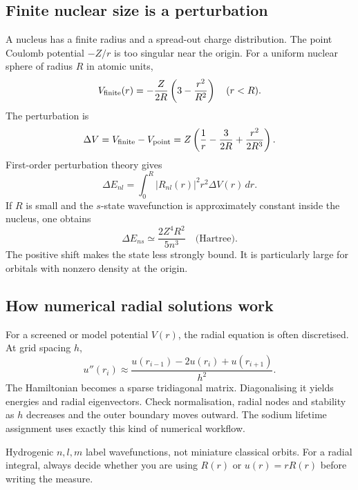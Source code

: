 \subsection{Finite nuclear size is a perturbation}
A nucleus has a finite radius and a spread-out
charge distribution. The point Coulomb potential
\(-Z/r\) is too singular near the origin.
For a uniform nuclear sphere of radius \(R\)
in atomic units,
\[
V_{\rm finite}(r)=
-\frac{Z}{2R}\left(3-\frac{r^2}{R^2}\right)
\quad(r<R).
\]
The perturbation is
\[
\Delta V=V_{\rm finite}-V_{\rm point}
=Z\left(\frac1r-\frac{3}{2R}
+\frac{r^2}{2R^3}\right).
\]
First-order perturbation theory gives
\[
\boxed{\Delta E_{nl}=\int_0^R
|R_{nl}(r)|^2r^2\Delta V(r)\,dr.}
\]
If \(R\) is small and the \(s\)-state
wavefunction is approximately constant
inside the nucleus, one obtains
\[
\boxed{\Delta E_{ns}\simeq
\frac{2Z^4R^2}{5n^3}\quad\text{(Hartree)}.}
\]
The positive shift makes the state less
strongly bound. It is particularly
large for orbitals with nonzero density
at the origin.

\subsection{How numerical radial solutions work}
For a screened or model potential \(V(r)\),
the radial equation is often discretised.
At grid spacing \(h\),
\[
u''(r_i)\approx
\frac{u(r_{i-1})-2u(r_i)+u(r_{i+1})}{h^2}.
\]
The Hamiltonian becomes a sparse
tridiagonal matrix. Diagonalising it
yields energies and radial eigenvectors.
Check normalisation, radial nodes and
stability as \(h\) decreases and
the outer boundary moves outward.
The sodium lifetime assignment uses
exactly this kind of numerical workflow.

\begin{checkpoint}
Hydrogenic \(n,l,m\) label wavefunctions,
not miniature classical orbits.
For a radial integral, always decide
whether you are using \(R(r)\) or
\(u(r)=rR(r)\) before writing the measure.
\end{checkpoint}
